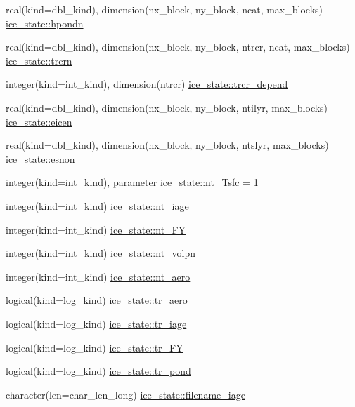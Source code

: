 \begin{DoxyCompactItemize}
real(kind=dbl\_\-kind), dimension(nx\_\-block, ny\_\-block, ncat, max\_\-blocks) \hyperlink{namespaceice__state_aa0ef224575214fdcb3ea6ccc63645a2d}{ice\_\-state::hpondn}
\item 
real(kind=dbl\_\-kind), dimension(nx\_\-block, ny\_\-block, ntrcr, ncat, max\_\-blocks) \hyperlink{namespaceice__state_a52d1c7e6719d1a295a7e5fab8b867dd1}{ice\_\-state::trcrn}
\item 
integer(kind=int\_\-kind), dimension(ntrcr) \hyperlink{namespaceice__state_a1690af0ac3de6ba93723f9eeab0dfe3f}{ice\_\-state::trcr\_\-depend}
\item 
real(kind=dbl\_\-kind), dimension(nx\_\-block, ny\_\-block, ntilyr, max\_\-blocks) \hyperlink{namespaceice__state_ae98b075caabb73fcd86ce51eb76849b4}{ice\_\-state::eicen}
\item 
real(kind=dbl\_\-kind), dimension(nx\_\-block, ny\_\-block, ntslyr, max\_\-blocks) \hyperlink{namespaceice__state_aeb23ce1b6f981d016e447371d318a10c}{ice\_\-state::esnon}
\item 
integer(kind=int\_\-kind), parameter \hyperlink{namespaceice__state_a40b462400c0ddbc648e6aa0dd6a417b7}{ice\_\-state::nt\_\-Tsfc} = 1
\item 
integer(kind=int\_\-kind) \hyperlink{namespaceice__state_aeae23c004739caada7b1be2f39df0927}{ice\_\-state::nt\_\-iage}
\item 
integer(kind=int\_\-kind) \hyperlink{namespaceice__state_a346a7cc45c174f3f489ba2e253bcf86f}{ice\_\-state::nt\_\-FY}
\item 
integer(kind=int\_\-kind) \hyperlink{namespaceice__state_afd23d1c712e37876224466b8f6b41c9a}{ice\_\-state::nt\_\-volpn}
\item 
integer(kind=int\_\-kind) \hyperlink{namespaceice__state_a17498b6cf9c7353f2704a5cd0b579718}{ice\_\-state::nt\_\-aero}
\item 
logical(kind=log\_\-kind) \hyperlink{namespaceice__state_a9a5f93f07c79fa1b586dbd336420fbfa}{ice\_\-state::tr\_\-aero}
\item 
logical(kind=log\_\-kind) \hyperlink{namespaceice__state_adad96297f8eb0305b0e5ed4db6e6fbd3}{ice\_\-state::tr\_\-iage}
\item 
logical(kind=log\_\-kind) \hyperlink{namespaceice__state_a086ac953805c6da5789990b53cb6b662}{ice\_\-state::tr\_\-FY}
\item 
logical(kind=log\_\-kind) \hyperlink{namespaceice__state_a56887007a4f4de6dd85325f308b9be48}{ice\_\-state::tr\_\-pond}
\item 
character(len=char\_\-len\_\-long) \hyperlink{namespaceice__state_ab39a4eb6530af3e7ded38f9876ddea95}{ice\_\-state::filename\_\-iage}

\end{DoxyCompactItemize}
